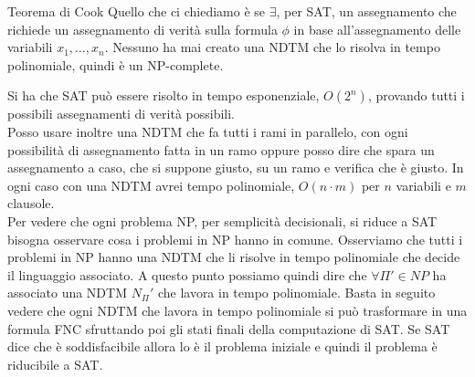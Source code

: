 \begin{teorema}{Teorema di Cook}{}
  Quello che ci chiediamo è se $\exists$, per SAT, un assegnamento che richiede un assegnamento di verità sulla formula $\phi$ in base all'assegnamento delle variabili $x_1,\ldots,x_n$. Nessuno ha mai creato una NDTM che lo risolva in tempo polinomiale, quindi è un NP-complete.  
\end{teorema}

Si ha che SAT può essere risolto in tempo esponenziale, $O(2^n)$, provando tutti i possibili assegnamenti di verità possibili.\\ Posso usare inoltre una NDTM che fa tutti i rami in parallelo, con ogni possibilità di assegnamento fatta in un ramo oppure posso dire che spara un assegnamento a caso, che si suppone giusto, su un ramo e verifica che è giusto. In ogni caso con una NDTM avrei tempo polinomiale, $O(n\cdot m)$ per $n$ variabili e $m$ clausole.\\

Per vedere che ogni problema NP, per semplicità decisionali, si riduce a SAT bisogna osservare cosa i problemi in NP hanno in comune. Osserviamo che tutti i problemi in NP hanno una NDTM che li risolve in tempo polinomiale che decide il linguaggio associato. A questo punto possiamo quindi dire che $\forall\Pi'\in NP$ ha associato una NDTM $N_\Pi'$ che lavora in tempo polinomiale. Basta in seguito vedere che ogni NDTM che lavora in tempo polinomiale si può trasformare in una formula FNC sfruttando poi gli stati finali della computazione di SAT. Se SAT dice che è soddisfacibile allora lo è il problema iniziale e quindi il problema è riducibile a SAT.